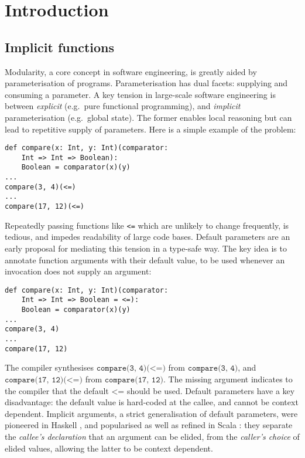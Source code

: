 \section{Introduction}

\subsection{Implicit functions}
Modularity, a core concept in software engineering, is greatly aided by
parameterisation of programs. Parameterisation has dual facets: supplying and
consuming a parameter.  A key tension in large-scale software engineering is
between \emph{explicit} (e.g.~pure functional programming), and \emph{implicit}
parameterisation (e.g.~global state).  The former enables local reasoning but
can lead to repetitive supply of parameters.  Here is a simple example of the
problem:

\begin{minipage}{\linewidth}
\begin{lstlisting}[mathescape]
def compare(x: Int, y: Int)(comparator:
    Int => Int => Boolean):
    Boolean = comparator(x)(y)
...
compare(3, 4)(<=)
...
compare(17, 12)(<=)
\end{lstlisting}
\end{minipage}

\noindent Repeatedly passing functions like \texttt{<=} which are unlikely to
change frequently, is tedious, and impedes readability of large code bases.
Default parameters  are an early proposal for mediating this tension in a
type-safe way. The key idea is to annotate function arguments with their
default value, to be used whenever an invocation does not supply an argument:

\begin{minipage}{\linewidth}
\begin{lstlisting}[mathescape]
def compare(x: Int, y: Int)(comparator:
    Int => Int => Boolean = <=):
    Boolean = comparator(x)(y)
...
compare(3, 4)
...
compare(17, 12)
\end{lstlisting}
\end{minipage}

\noindent The compiler synthesises $\texttt{compare(3, 4)(<=)}$ from
$\texttt{compare(3, 4)}$, and $\texttt{compare(17, 12)(<=)}$ from
$\texttt{compare(17, 12)}$. The missing argument indicates to the compiler that
the default $\texttt{<=}$ should be used. Default parameters have a key
disadvantage: the default value is hard-coded at the callee, and cannot be
context dependent. Implicit arguments, a strict generalisation of default
parameters, were pioneered in Haskell \cite{LLMS00}, and popularised as well as
refined  in Scala \cite{OBLB18}: they separate the \emph{callee's declaration}
that an argument can be elided, from the \emph{caller's choice} of elided
values, allowing the latter to be context dependent.

